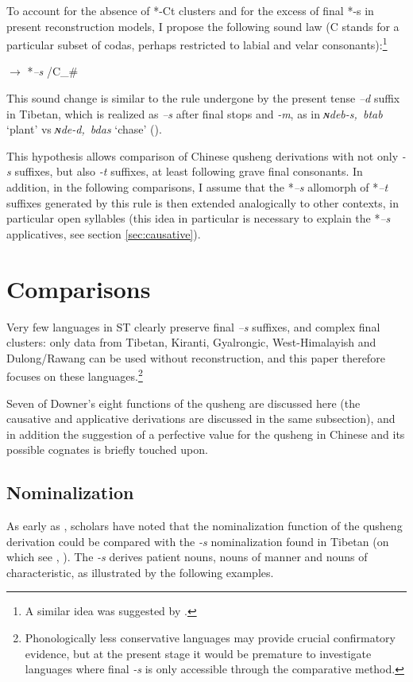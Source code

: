 \documentclass[oneside,a4paper,11pt]{article}
\newcommand{\ipa}[1]{{\phon\textit{\mbox{#1}}}}
\begin{document}
To account for the absence of *-Ct clusters and for the excess of final *-s in present reconstruction models, I propose the following sound law (C stands for a particular subset of codas, perhaps restricted to labial and velar consonants):\footnote{A similar idea was suggested by \citet[42]{schuessler07}.}

\begin{exe}
\ex \label{ex:ts}
\glt *\ipa{--t} $\rightarrow$ *\ipa{--s} /C\_\# 
\end{exe}

This sound change is similar to the rule undergone by the present tense \ipa{--d} suffix in Tibetan, which is realized as \ipa{--s} after final stops and \ipa{-m}, as in \ipa{ɴdeb-s, btab}   `plant' vs \ipa{ɴde-d, bdas}   `chase' (\citealt[52-53]{coblin76}). 

This hypothesis allows comparison of Chinese qusheng derivations with not only \ipa{-s} suffixes, but also \ipa{-t} suffixes, at least following grave final consonants. In addition, in the following comparisons, I assume that the *\ipa{--s} allomorph of *\ipa{--t} suffixes generated by this rule is then extended analogically to other contexts, in particular open syllables (this idea in particular is necessary to explain the *\ipa{--s} applicatives, see section \ref{sec:causative}).


\section{Comparisons}

Very few languages in ST clearly preserve final \ipa{--s} suffixes, and complex final clusters: only data from Tibetan, Kiranti, Gyalrongic, West-Himalayish and Dulong/Rawang can be used without reconstruction, and this paper therefore focuses on these languages.\footnote{Phonologically less conservative languages may provide crucial confirmatory evidence, but at the present stage it would be premature to investigate languages where final \ipa{-s} is only accessible through the comparative method. }

Seven of Downer's eight functions of the qusheng are discussed here (the causative and applicative derivations are discussed in the same subsection), and in addition the suggestion of a perfective value for the qusheng in Chinese and its possible cognates is briefly touched upon.

\subsection{Nominalization} \label{sec:nmlz}
As early as \citet{forrest60occlusives}, scholars have noted that the nominalization function of the qusheng derivation could be compared with the \ipa{-s} nominalization found in Tibetan (on which see \citealt[43]{conrady1896}, \citealt[624-5]{hill14derivational}). The \ipa{-s} derives patient nouns, nouns of manner and nouns of characteristic, as illustrated by the following examples. 
\end{document}
